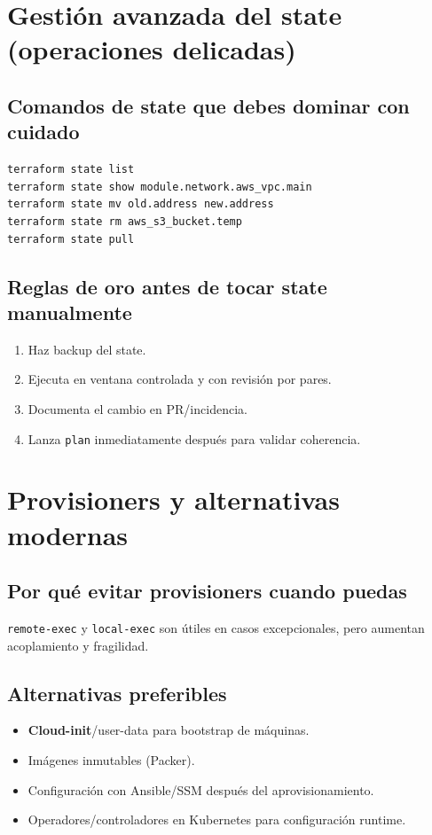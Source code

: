 \documentclass[12pt,a4paper]{article}
\begin{document}
\section{Gestión avanzada del state (operaciones delicadas)}

\subsection{Comandos de state que debes dominar con cuidado}
\begin{lstlisting}[caption=State operations]
terraform state list
terraform state show module.network.aws_vpc.main
terraform state mv old.address new.address
terraform state rm aws_s3_bucket.temp
terraform state pull
\end{lstlisting}

\subsection{Reglas de oro antes de tocar state manualmente}
\begin{enumerate}
		\item Haz backup del state.
		\item Ejecuta en ventana controlada y con revisión por pares.
		\item Documenta el cambio en PR/incidencia.
		\item Lanza \texttt{plan} inmediatamente después para validar coherencia.
\end{enumerate}

\section{Provisioners y alternativas modernas}

\subsection{Por qué evitar provisioners cuando puedas}
\texttt{remote-exec} y \texttt{local-exec} son útiles en casos excepcionales, pero aumentan acoplamiento y fragilidad.

\subsection{Alternativas preferibles}
\begin{itemize}
		\item \textbf{Cloud-init}/user-data para bootstrap de máquinas.
		\item Imágenes inmutables (Packer).
		\item Configuración con Ansible/SSM después del aprovisionamiento.
		\item Operadores/controladores en Kubernetes para configuración runtime.
\end{itemize}
\end{document}
